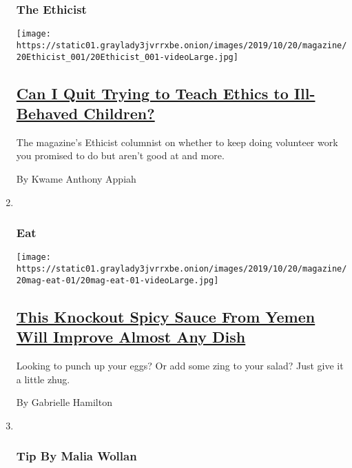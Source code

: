\begin{enumerate}
{  \subsubsection{The Ethicist}\label{the-ethicist}}

  \texttt{[image: https://static01.graylady3jvrrxbe.onion/images/2019/10/20/magazine/20Ethicist\_001/20Ethicist\_001-videoLarge.jpg]}

  \hypertarget{can-i-quit-trying-to-teach-ethics-to-ill-behaved-children}{%
  \subsection{\texorpdfstring{\href{/2019/10/15/magazine/teaching-children-volunteer-ethics.html}{Can
  I Quit Trying to Teach Ethics to Ill-Behaved
  Children?}}{Can I Quit Trying to Teach Ethics to Ill-Behaved Children?}}\label{can-i-quit-trying-to-teach-ethics-to-ill-behaved-children}}

  The magazine's Ethicist columnist on whether to keep doing volunteer
  work you promised to do but aren't good at and more.

  By Kwame Anthony Appiah
\item ~
  \hypertarget{eat}{%
  \subsubsection{Eat}\label{eat}}

  \texttt{[image: https://static01.graylady3jvrrxbe.onion/images/2019/10/20/magazine/20mag-eat-01/20mag-eat-01-videoLarge.jpg]}

  \hypertarget{this-knockout-spicy-sauce-from-yemen-will-improve-almost-any-dish}{%
  \subsection{\texorpdfstring{\href{/2019/10/16/magazine/zhug-yemeni-sauce-recipe.html}{This
  Knockout Spicy Sauce From Yemen Will Improve Almost Any
  Dish}}{This Knockout Spicy Sauce From Yemen Will Improve Almost Any Dish}}\label{this-knockout-spicy-sauce-from-yemen-will-improve-almost-any-dish}}

  Looking to punch up your eggs? Or add some zing to your salad? Just
  give it a little zhug.

  By Gabrielle Hamilton
\item ~
  \hypertarget{tip-by-malia-wollan}{%
  \subsubsection{Tip By Malia Wollan}\label{tip-by-malia-wollan}}


\end{enumerate}
